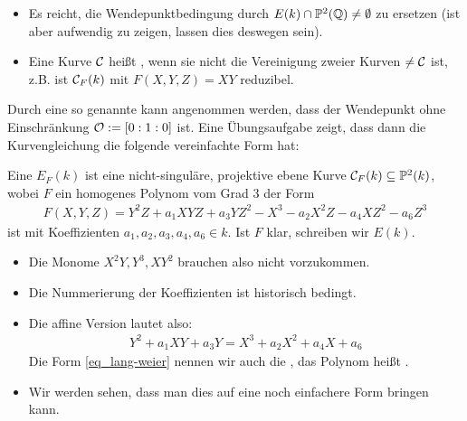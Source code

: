 \begin{bem}
	\begin{itemize}
		\item Es reicht, die Wendepunktbedingung durch $E(k) \cap \mathbb{P}^2(\mathbb{Q}) \neq \emptyset$ zu ersetzen (ist aber aufwendig zu zeigen, lassen dies deswegen sein).
		\item Eine Kurve $\mathcal{C}$ heißt , wenn sie nicht die Vereinigung zweier Kurven $\neq \mathcal{C}$ ist, z.B. ist $\mathcal{C}_F(k)$ mit $F(X,Y,Z) = XY$ reduzibel.
	\end{itemize}
\end{bem}

\begin{bem}
	Durch eine so genannte  kann angenommen werden, dass der Wendepunkt ohne Einschränkung $\mathcal{O} := [0:1:0]$ ist. 
	Eine Übungsaufgabe zeigt, dass dann die Kurvengleichung die folgende vereinfachte Form hat:
\end{bem}

\begin{defn}
	Eine  $E_F(k)$ ist eine nicht-singuläre, projektive ebene Kurve $\mathcal{C}_F(k) \subseteq \mathbb{P}^2(k)$, wobei $F$ ein homogenes Polynom vom Grad $3$ der Form
	\begin{equation}
	\begin{aligned}
		F(X,Y,Z) = Y^2 Z + a_1 XYZ + a_3 YZ^2 - X^3 - a_2X^2 Z - a_4 XZ^2 - a_6Z^3 \label{eq_lang-weier}
	\end{aligned}
	\end{equation}
	ist mit Koeffizienten $a_1,a_2,a_3,a_4,a_6 \in k$. 
	Ist $F$ klar, schreiben wir $E(k)$. 
\end{defn}
\setcounter{counter}{3}
\begin{bem}
	\begin{itemize}
		\item Die Monome $X^2Y, Y^3, XY^2$ brauchen also nicht vorzukommen.
		\item Die Nummerierung der Koeffizienten ist historisch bedingt.
		\item Die affine Version lautet also:
		\begin{equation}
		\begin{aligned}
			Y^2 + a_1 XY + a_3 Y = X^3 + a_2 X^2 + a_4 X + a_6 \label{eq_lang-weier-aff}
		\end{aligned}
		\end{equation}
		Die Form \eqref{eq_lang-weier} nennen wir auch die , das Polynom heißt .
		\item Wir werden sehen, dass man dies auf eine noch einfachere Form bringen kann.
	\end{itemize}
\end{bem}

